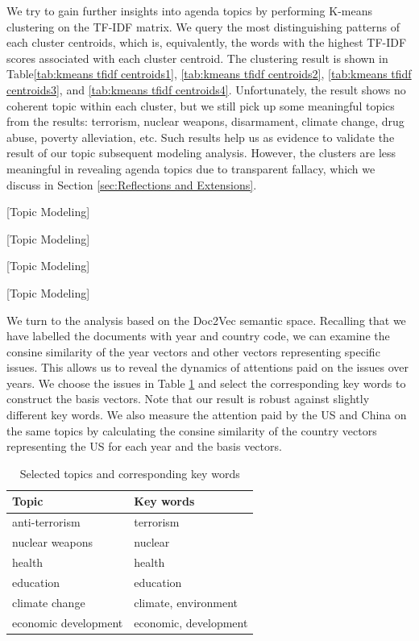 \documentclass[final,authoryear,3p,12pt,times,hidelinks]{elsarticle}
\begin{document}
We try to gain further insights into agenda topics by performing K-means clustering on the TF-IDF matrix. We query the most distinguishing patterns of each cluster centroids, which is, equivalently, the words with the highest TF-IDF scores associated with each cluster centroid. The clustering result is shown in Table\ref{tab:kmeans tfidf centroids1}, \ref{tab:kmeans tfidf centroids2}, \ref{tab:kmeans tfidf centroids3}, and \ref{tab:kmeans tfidf centroids4}. Unfortunately, the result shows no coherent topic within each cluster, but we still pick up some meaningful topics from the results: terrorism, nuclear weapons, disarmament, climate change, drug abuse, poverty alleviation, etc. Such results help us as evidence to validate the result of our topic subsequent modeling analysis. However, the clusters are less meaningful in revealing agenda topics due to transparent fallacy, which we discuss in Section \ref{sec:Reflections and Extensions}. 

[Topic Modeling]

[Topic Modeling]

[Topic Modeling]

[Topic Modeling]

We turn to the analysis based on the Doc2Vec semantic space. Recalling that we have labelled the documents with year and country code, we can examine the consine similarity of the year vectors and other vectors representing specific issues. This allows us to reveal the dynamics of attentions paid on the issues over years. We choose the issues in Table \ref{tab:attention dynamics choose issues} and select the corresponding key words to construct the basis vectors. Note that our result is robust against slightly different key words. We also measure the attention paid by the US and China on the same topics by calculating the consine similarity of the country vectors representing the US for each year and the basis vectors. 

\begin{table}[ht!]
  \centering
  \caption{Selected topics and corresponding key words}
  \begin{tabular}{l l} 
  \hline
  Topic & Key words \\
  \hline 
  anti-terrorism & terrorism \\
  nuclear weapons & nuclear \\
  health & health \\
  education & education \\
  climate change & climate, environment \\
  economic development & economic, development \\
  \hline
  \end{tabular}
  \label{tab:attention dynamics choose issues}
\end{table}
\end{document}
